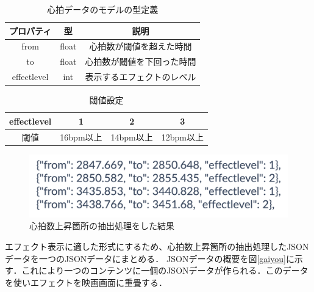 \begin{table}[htb]
    \begin{center}
        \caption{心拍データのモデルの型定義}
        
        \label{model}
            \begin{tabular}{|c|c|c|} \hline
            	プロパティ & 型 & 説明  \\ \hline \hline
                from & float & 心拍数が閾値を超えた時間 \\ \hline
                to & float & 心拍数が閾値を下回った時間 \\ \hline
                effectlevel & int & 表示するエフェクトのレベル \\ \hline
            \end{tabular}
    \end{center}
\end{table}


\begin{table}[htb]
    \begin{center}
        \caption{閾値設定}
        
        \label{effectlevel}
            \begin{tabular}{|c|c|c|c|} \hline 
            	effectlevel & 1 & 2 & 3  \\ \hline 
                閾値 & 16bpm以上 & 14bpm以上 & 12bpm以上 \\ \hline
            \end{tabular}
    \end{center}
\end{table}



\begin{figure}[H]
    \centering
    \includegraphics[width=16cm]{images/chapter3/level.png}
    \caption{心拍数上昇箇所の抽出処理をした結果}
    \label{bpmsyori}
\end{figure}


エフェクト表示に適した形式にするため、心拍数上昇箇所の抽出処理したJSONデータを一つのJSONデータにまとめる．
JSONデータの概要を図\ref{gaiyou}に示す．これにより一つのコンテンツに一個のJSONデータが作られる．このデータを使いエフェクトを映画画面に重畳する．

